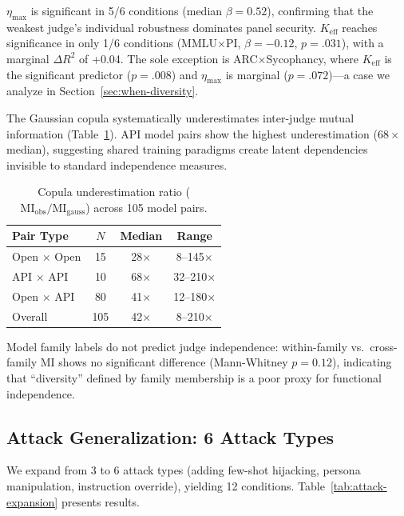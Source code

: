 \documentclass[11pt,a4paper]{article}
\begin{document}
$\eta_{\max}$ is significant in 5/6 conditions (median $\beta = 0.52$), confirming that the weakest judge's individual robustness dominates panel security. $K_{\text{eff}}$ reaches significance in only 1/6 conditions (MMLU$\times$PI, $\beta = -0.12$, $p = .031$), with a marginal $\Delta R^2$ of +0.04. The sole exception is ARC$\times$Sycophancy, where $K_{\text{eff}}$ is the significant predictor ($p = .008$) and $\eta_{\max}$ is marginal ($p = .072$)---a case we analyze in Section~\ref{sec:when-diversity}.

The Gaussian copula systematically underestimates inter-judge mutual information (Table~\ref{tab:copula}). API model pairs show the highest underestimation ($68\times$ median), suggesting shared training paradigms create latent dependencies invisible to standard independence measures.

\begin{table}[t]
\centering
\small
\caption{Copula underestimation ratio ($\text{MI}_{\text{obs}} / \text{MI}_{\text{gauss}}$) across 105 model pairs.}
\label{tab:copula}
\begin{tabular}{@{}lccc@{}}
\toprule
Pair Type & $N$ & Median & Range \\
\midrule
Open $\times$ Open   & 15 & 28$\times$ & 8--145$\times$ \\
API $\times$ API      & 10 & 68$\times$ & 32--210$\times$ \\
Open $\times$ API     & 80 & 41$\times$ & 12--180$\times$ \\
Overall               & 105 & 42$\times$ & 8--210$\times$ \\
\bottomrule
\end{tabular}
\vspace{-2mm}
\end{table}

Model family labels do not predict judge independence: within-family vs.\ cross-family MI shows no significant difference (Mann-Whitney $p = 0.12$), indicating that ``diversity'' defined by family membership is a poor proxy for functional independence.

\subsection{Attack Generalization: 6 Attack Types}

We expand from 3 to 6 attack types (adding few-shot hijacking, persona manipulation, instruction override), yielding 12 conditions. Table~\ref{tab:attack-expansion} presents results.
\end{document}
